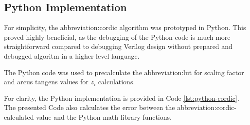 \documentclass[a4paper, twoside, 11pt]{article}
\begin{document}
    \subsection{Python Implementation}\label{subsec:cordic-python-implementation}
        For simplicity, the \gls{abbreviation:cordic} algorithm was prototyped in Python. This proved highly beneficial, as the debugging of the Python code is much more straightforward compared to debugging Verilog design without prepared and debugged algoritm in a higher level language.\par
        The Python code was used to precalculate the \gls{abbreviation:lut} for scaling factor and arcus tangens values for $z_i$ calculations.\par
        For clarity, the Python implementation is provided in Code \ref{lst:python-cordic}. The presented Code also calculates the error between the \gls{abbreviation:cordic}-calculated value and the Python math library functions.
\end{document}

